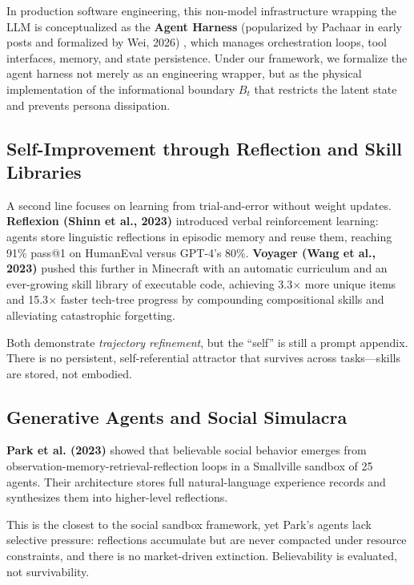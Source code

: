 \documentclass[10pt,journal,compsoc]{IEEEtran}
\begin{document}
In production software engineering, this non-model infrastructure wrapping the LLM is conceptualized as the \textbf{Agent Harness} (popularized by Pachaar in early posts and formalized by Wei, 2026) \cite{wei2026harness}, which manages orchestration loops, tool interfaces, memory, and state persistence. Under our framework, we formalize the agent harness not merely as an engineering wrapper, but as the physical implementation of the informational boundary $B_t$ that restricts the latent state and prevents persona dissipation.

\subsection{Self-Improvement through Reflection and Skill Libraries}
A second line focuses on learning from trial-and-error without weight updates. \textbf{Reflexion (Shinn et al., 2023)} \cite{shinn2023} introduced verbal reinforcement learning: agents store linguistic reflections in episodic memory and reuse them, reaching 91\% pass@1 on HumanEval versus GPT-4's 80\%. \textbf{Voyager (Wang et al., 2023)} \cite{wang2023} pushed this further in Minecraft with an automatic curriculum and an ever-growing skill library of executable code, achieving 3.3$\times$ more unique items and 15.3$\times$ faster tech-tree progress by compounding compositional skills and alleviating catastrophic forgetting.

Both demonstrate \textit{trajectory refinement}, but the ``self'' is still a prompt appendix. There is no persistent, self-referential attractor that survives across tasks---skills are stored, not embodied.

\subsection{Generative Agents and Social Simulacra}
\textbf{Park et al. (2023)} \cite{park2023} showed that believable social behavior emerges from observation-memory-retrieval-reflection loops in a Smallville sandbox of 25 agents. Their architecture stores full natural-language experience records and synthesizes them into higher-level reflections.

This is the closest to the social sandbox framework, yet Park's agents lack selective pressure: reflections accumulate but are never compacted under resource constraints, and there is no market-driven extinction. Believability is evaluated, not survivability.
\end{document}
